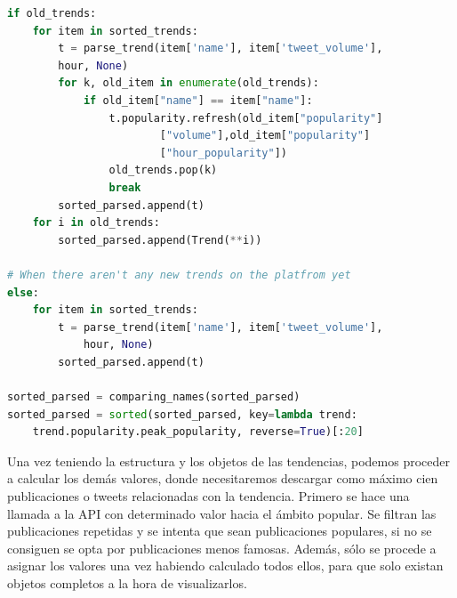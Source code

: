 \begin{lstlisting}[caption=Creación de la estructura de tendencias,          label={lst:listing-python},language=Python]
if old_trends:
    for item in sorted_trends:
        t = parse_trend(item['name'], item['tweet_volume'],
        hour, None)
        for k, old_item in enumerate(old_trends):
            if old_item["name"] == item["name"]:
                t.popularity.refresh(old_item["popularity"]
                        ["volume"],old_item["popularity"]
                        ["hour_popularity"])
                old_trends.pop(k)
                break
        sorted_parsed.append(t)
    for i in old_trends:
        sorted_parsed.append(Trend(**i))

# When there aren't any new trends on the platfrom yet
else:
    for item in sorted_trends:
        t = parse_trend(item['name'], item['tweet_volume'],
            hour, None)
        sorted_parsed.append(t)

sorted_parsed = comparing_names(sorted_parsed)
sorted_parsed = sorted(sorted_parsed, key=lambda trend:
    trend.popularity.peak_popularity, reverse=True)[:20]
\end{lstlisting}

Una vez teniendo la estructura y los objetos de las tendencias, podemos proceder a calcular los demás valores, donde necesitaremos descargar como máximo cien publicaciones o tweets relacionadas con la tendencia. Primero se hace una llamada a la API con determinado valor hacia el ámbito popular. Se filtran las publicaciones repetidas y se intenta que sean publicaciones populares, si no se consiguen se opta por publicaciones menos famosas. Además, sólo se procede a asignar los valores una vez habiendo calculado todos ellos, para que solo existan objetos completos a la hora de visualizarlos.

\vspace{0.3cm}

